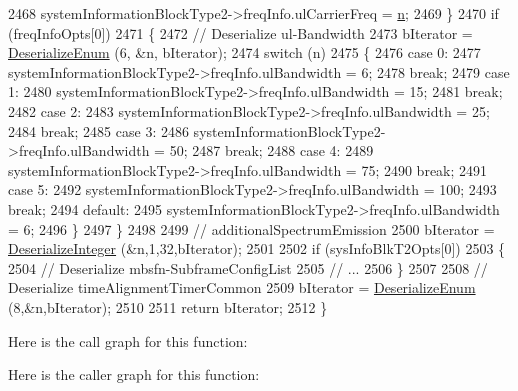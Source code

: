 \begin{DoxyCode}
2468       systemInformationBlockType2->freqInfo.ulCarrierFreq = \hyperlink{namespacesample-rng-plot_aeb5ee5c431e338ef39b7ac5431242e1d}{n};
2469     \}
2470   \textcolor{keywordflow}{if} (freqInfoOpts[0])
2471     \{
2472       \textcolor{comment}{// Deserialize ul-Bandwidth}
2473       bIterator = \hyperlink{classns3_1_1Asn1Header_a4fcc253e0eec3483c775b005c1875f2d}{DeserializeEnum} (6, &n, bIterator);
2474       \textcolor{keywordflow}{switch} (n)
2475         \{
2476         \textcolor{keywordflow}{case} 0:
2477           systemInformationBlockType2->freqInfo.ulBandwidth = 6;
2478           \textcolor{keywordflow}{break};
2479         \textcolor{keywordflow}{case} 1:
2480           systemInformationBlockType2->freqInfo.ulBandwidth = 15;
2481           \textcolor{keywordflow}{break};
2482         \textcolor{keywordflow}{case} 2:
2483           systemInformationBlockType2->freqInfo.ulBandwidth = 25;
2484           \textcolor{keywordflow}{break};
2485         \textcolor{keywordflow}{case} 3:
2486           systemInformationBlockType2->freqInfo.ulBandwidth = 50;
2487           \textcolor{keywordflow}{break};
2488         \textcolor{keywordflow}{case} 4:
2489           systemInformationBlockType2->freqInfo.ulBandwidth = 75;
2490           \textcolor{keywordflow}{break};
2491         \textcolor{keywordflow}{case} 5:
2492           systemInformationBlockType2->freqInfo.ulBandwidth = 100;
2493           \textcolor{keywordflow}{break};
2494         \textcolor{keywordflow}{default}:
2495           systemInformationBlockType2->freqInfo.ulBandwidth = 6;
2496         \}
2497     \}
2498 
2499   \textcolor{comment}{// additionalSpectrumEmission}
2500   bIterator = \hyperlink{classns3_1_1Asn1Header_a49802c9af30018b078150e866b6ecae2}{DeserializeInteger} (&n,1,32,bIterator);
2501 
2502   \textcolor{keywordflow}{if} (sysInfoBlkT2Opts[0])
2503     \{
2504       \textcolor{comment}{// Deserialize mbsfn-SubframeConfigList}
2505       \textcolor{comment}{// ...}
2506     \}
2507 
2508   \textcolor{comment}{// Deserialize timeAlignmentTimerCommon}
2509   bIterator = \hyperlink{classns3_1_1Asn1Header_a4fcc253e0eec3483c775b005c1875f2d}{DeserializeEnum} (8,&n,bIterator);
2510 
2511   \textcolor{keywordflow}{return} bIterator;
2512 \}
\end{DoxyCode}


Here is the call graph for this function\+:




Here is the caller graph for this function\+:


